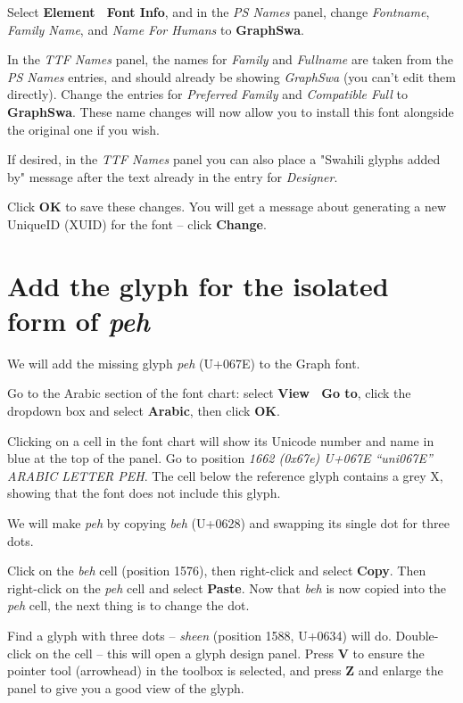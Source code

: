 Select \textbf{Element \textrightarrow\ Font Info}, and in the \textit{PS Names} panel, change \textit{Fontname}, \textit{Family Name}, and \textit{Name For Humans} to \textbf{GraphSwa}.

In the \textit{TTF Names} panel, the names for \textit{Family} and \textit{Fullname} are taken from the \textit{PS Names} entries, and should already be showing \textit{GraphSwa} (you can't edit them directly).  Change the entries for \textit{Preferred Family} and \textit{Compatible Full} to \textbf{GraphSwa}.  These name changes will now allow you to install this font alongside the original one if you wish.

If desired, in the \textit{TTF Names} panel you can also place a "Swahili glyphs added by" message after the text already in the entry for \textit{Designer}.

Click \textbf{OK} to save these changes.  You will get a message about generating a new UniqueID (XUID) for the font -- click \textbf{Change}.

\section{Add the glyph for the isolated form of \textit{peh}}
\label{s:pehisol}

We will add the missing glyph \textit{peh} (U+067E) to the Graph font.

Go to the Arabic section of the font chart: select \textbf{View \textrightarrow\ Go to}, click the dropdown box and select \textbf{Arabic}, then click \textbf{OK}.

Clicking on a cell in the font chart will show its Unicode number and name in blue at the top of the panel.  Go to position \textit{1662 (0x67e) U+067E ``uni067E'' ARABIC LETTER PEH}.  The cell below the reference glyph contains a grey X, showing that the font does not include this glyph.

We will make \textit{peh} by copying \textit{beh} (U+0628) and swapping its single dot for three dots.

Click on the \textit{beh} cell (position 1576), then right-click and select \textbf{Copy}.  Then right-click on the \textit{peh} cell and select \textbf{Paste}.  Now that \textit{beh} is now copied into the \textit{peh} cell, the next thing is to change the dot.

Find a glyph with three dots -- \textit{sheen} (position 1588, U+0634) will do.  Double-click on the cell -- this will open a glyph design panel.  Press \textbf{V} to ensure the pointer tool (arrowhead) in the toolbox is selected, and press \textbf{Z} and enlarge the panel to give you a good view of the glyph.

